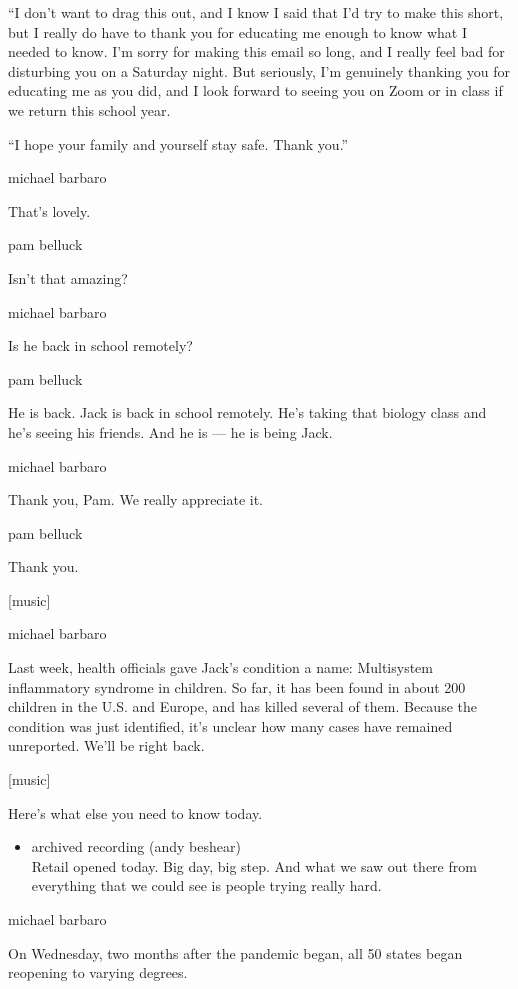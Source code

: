 ``I don't want to drag this out, and I know I said that I'd try to make
this short, but I really do have to thank you for educating me enough to
know what I needed to know. I'm sorry for making this email so long, and
I really feel bad for disturbing you on a Saturday night. But seriously,
I'm genuinely thanking you for educating me as you did, and I look
forward to seeing you on Zoom or in class if we return this school year.

``I hope your family and yourself stay safe. Thank you.''

michael barbaro

That's lovely.

pam belluck

Isn't that amazing?

michael barbaro

Is he back in school remotely?

pam belluck

He is back. Jack is back in school remotely. He's taking that biology
class and he's seeing his friends. And he is --- he is being Jack.

michael barbaro

Thank you, Pam. We really appreciate it.

pam belluck

Thank you.

{[}music{]}

michael barbaro

Last week, health officials gave Jack's condition a name: Multisystem
inflammatory syndrome in children. So far, it has been found in about
200 children in the U.S. and Europe, and has killed several of them.
Because the condition was just identified, it's unclear how many cases
have remained unreported. We'll be right back.

{[}music{]}

Here's what else you need to know today.

\begin{itemize}
\tightlist
\item
  archived recording (andy beshear)\\
  Retail opened today. Big day, big step. And what we saw out there from
  everything that we could see is people trying really hard.
\end{itemize}

michael barbaro

On Wednesday, two months after the pandemic began, all 50 states began
reopening to varying degrees.

